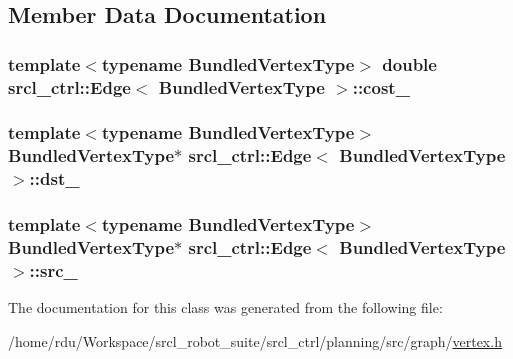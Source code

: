 \subsection{Member Data Documentation}
\hypertarget{classsrcl__ctrl_1_1Edge_a96acac663e9aad716e361510f4862a0b}{
\subsubsection[{cost\-\_\-}]{\setlength{\rightskip}{0pt plus 5cm}template$<$typename Bundled\-Vertex\-Type$>$ double {\bf srcl\-\_\-ctrl\-::\-Edge}$<$ Bundled\-Vertex\-Type $>$\-::cost\-\_\-}}\label{classsrcl__ctrl_1_1Edge_a96acac663e9aad716e361510f4862a0b}
\hypertarget{classsrcl__ctrl_1_1Edge_a89a55fd037800ae1cfe32e0b4475500e}{
\subsubsection[{dst\-\_\-}]{\setlength{\rightskip}{0pt plus 5cm}template$<$typename Bundled\-Vertex\-Type$>$ Bundled\-Vertex\-Type$\ast$ {\bf srcl\-\_\-ctrl\-::\-Edge}$<$ Bundled\-Vertex\-Type $>$\-::dst\-\_\-}}\label{classsrcl__ctrl_1_1Edge_a89a55fd037800ae1cfe32e0b4475500e}
\hypertarget{classsrcl__ctrl_1_1Edge_a2403b33c073ea4730a897cd9d2cb5216}{
\subsubsection[{src\-\_\-}]{\setlength{\rightskip}{0pt plus 5cm}template$<$typename Bundled\-Vertex\-Type$>$ Bundled\-Vertex\-Type$\ast$ {\bf srcl\-\_\-ctrl\-::\-Edge}$<$ Bundled\-Vertex\-Type $>$\-::src\-\_\-}}\label{classsrcl__ctrl_1_1Edge_a2403b33c073ea4730a897cd9d2cb5216}


The documentation for this class was generated from the following file\-:\begin{DoxyCompactItemize}
\item 
/home/rdu/\-Workspace/srcl\-\_\-robot\-\_\-suite/srcl\-\_\-ctrl/planning/src/graph/\hyperlink{vertex_8h}{vertex.\-h}\end{DoxyCompactItemize}
